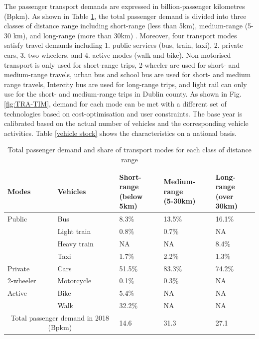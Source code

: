 \documentclass[journal abbreviation, manuscript]{copernicus}
\begin{document}
The passenger transport demands are expressed in billion-passenger kilometres (Bpkm). As shown in Table \ref{passenger transport demand}, the total passenger demand is divided into three classes of distance range including short-range (less than 5km), medium-range (5-30 km), and long-range (more than 30km) \cite{NTA2018}. Moreover, four transport modes satisfy travel demands including 1. public services (bus, train, taxi), 2. private cars, 3. two-wheelers, and 4. active modes (walk and bike). Non-motorised transport is only used for short-range trips, 2-wheeler are used for short- and medium-range travels, urban bus and school bus are used for short- and medium range travels, Intercity bus are used for long-range trips, and light rail can only use for the short- and medium-range trips in Dublin county. As shown in Fig. \ref{fig:TRA-TIM}, demand for each mode can be met with a different set of technologies based on cost-optimisation and user constraints. The base year is calibrated based on the actual number of vehicles and the corresponding vehicle activities. Table \ref{vehicle stock} shows the characteristics on a national basis. 

\begin{table}[h!]
 \centering
 \footnotesize
 \caption{Total passenger demand and share of transport modes for each class of distance range \cite{CentralStatisticsOffice2020a, CentralStatisticsOffice2020b, CentralStatisticsOffice2020c, CentralStatisticsOffice2020d, CentralStatisticsOffice2020e, CentralStatisticsOffice2017}}
 \begin{tabular}{lllll}
 \hline 
 Modes & Vehicles & \makecell{Short-range \\ (below 5km)} & \makecell{Medium-range \\ (5-30km)} & \makecell{Long-range \\ (over 30km)} \\ 
 \hline
 Public & Bus & 8.3\% &	13.5\% &	16.1\% \\
 & Light train &	0.8\% &	0.7\% &	NA \\
 & Heavy train &	NA & NA &	8.4\% \\
 & Taxi &	1.7\% &	2.2\% &	1.3\% \\
 \hline
 Private & Cars	& 51.5\% &	83.3\%	& 74.2\% \\
 \hline
 2-wheeler & Motorcycle & 0.1\% &	0.3\%	& NA \\
 \hline
 Active & Bike &	5.4\% & 	NA & 	NA \\
 
 & Walk &	32.2\% &	NA &	NA \\
 \hline
 \multicolumn{2}{c}{Total passenger demand in 2018 (Bpkm)} &	14.6 &	31.3 &	27.1 \\ [1ex]
 \hline
 \end{tabular}
 
 \label{passenger transport demand}
\end{table}
\end{document}
